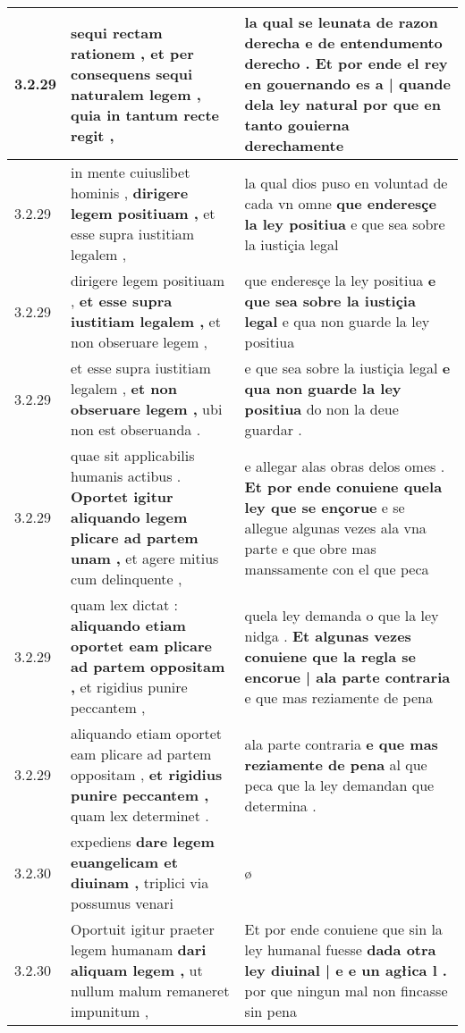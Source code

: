 \begin{tabular}{|p{1cm}|p{6.5cm}|p{6.5cm}|}
3.2.29 & sequi rectam rationem , \textbf{ et per consequens sequi naturalem legem , } quia in tantum recte regit , & la qual se leunata de razon derecha e de entendumento derecho . \textbf{ Et por ende el rey en gouernando es a | quande dela ley natural } por que en tanto gouierna derechamente \\\hline
3.2.29 & in mente cuiuslibet hominis , \textbf{ dirigere legem positiuam , } et esse supra iustitiam legalem , & la qual dios puso en voluntad de cada vn omne \textbf{ que enderesçe la ley positiua } e que sea sobre la iustiçia legal \\\hline
3.2.29 & dirigere legem positiuam , \textbf{ et esse supra iustitiam legalem , } et non obseruare legem , & que enderesçe la ley positiua \textbf{ e que sea sobre la iustiçia legal } e qua non guarde la ley positiua \\\hline
3.2.29 & et esse supra iustitiam legalem , \textbf{ et non obseruare legem , } ubi non est obseruanda . & e que sea sobre la iustiçia legal \textbf{ e qua non guarde la ley positiua } do non la deue guardar . \\\hline
3.2.29 & quae sit applicabilis humanis actibus . \textbf{ Oportet igitur aliquando legem plicare ad partem unam , } et agere mitius cum delinquente , & e allegar alas obras delos omes . \textbf{ Et por ende conuiene quela ley que se ençorue } e se allegue algunas vezes ala vna parte e que obre mas manssamente con el que peca \\\hline
3.2.29 & quam lex dictat : \textbf{ aliquando etiam oportet eam plicare ad partem oppositam , } et rigidius punire peccantem , & quela ley demanda o que la ley nidga . \textbf{ Et algunas vezes conuiene que la regla se encorue | ala parte contraria } e que mas reziamente de pena \\\hline
3.2.29 & aliquando etiam oportet eam plicare ad partem oppositam , \textbf{ et rigidius punire peccantem , } quam lex determinet . & ala parte contraria \textbf{ e que mas reziamente de pena } al que peca que la ley demandan que determina . \\\hline
3.2.30 & expediens \textbf{ dare legem euangelicam et diuinam , } triplici via possumus venari & ø \\\hline
3.2.30 & Oportuit igitur praeter legem humanam \textbf{ dari aliquam legem , } ut nullum malum remaneret impunitum , & Et por ende conuiene que sin la ley humanal fuesse \textbf{ dada otra ley diuinal | e e un agłica l . } por que ningun mal non fincasse sin pena \\\hline

\end{tabular}
